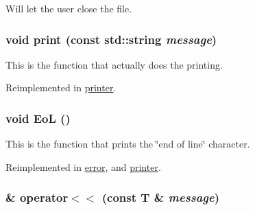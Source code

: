 Will let the user close the file. \hypertarget{classJKBuilder_1_1IOManager_a3abc9519dd5220ecb1154daa25f557fe}{
\subsubsection[{print}]{\setlength{\rightskip}{0pt plus 5cm}void print (const std::string {\em message})}}
\label{classJKBuilder_1_1IOManager_a3abc9519dd5220ecb1154daa25f557fe}


This is the function that actually does the printing. 

Reimplemented in \hyperlink{classJKBuilder_1_1printer_aa32ee0a81ade611982bfc9861c5a05bb}{printer}.\hypertarget{classJKBuilder_1_1IOManager_a7f207ac705d33a0cd9794a9f0b4a1fa0}{
\subsubsection[{EoL}]{\setlength{\rightskip}{0pt plus 5cm}void EoL ()}}
\label{classJKBuilder_1_1IOManager_a7f207ac705d33a0cd9794a9f0b4a1fa0}


This is the function that prints the \char`\"{}end of line\char`\"{} character. 

Reimplemented in \hyperlink{classJKBuilder_1_1error_a7f207ac705d33a0cd9794a9f0b4a1fa0}{error}, and \hyperlink{classJKBuilder_1_1printer_a7f207ac705d33a0cd9794a9f0b4a1fa0}{printer}.\hypertarget{classJKBuilder_1_1IOManager_a505a35212a21e4884ed24b021c0add4b}{
\subsubsection[{operator$<$$<$}]{ \& operator$<$$<$ (const T \& {\em message})}}
\label{classJKBuilder_1_1IOManager_a505a35212a21e4884ed24b021c0add4b}


